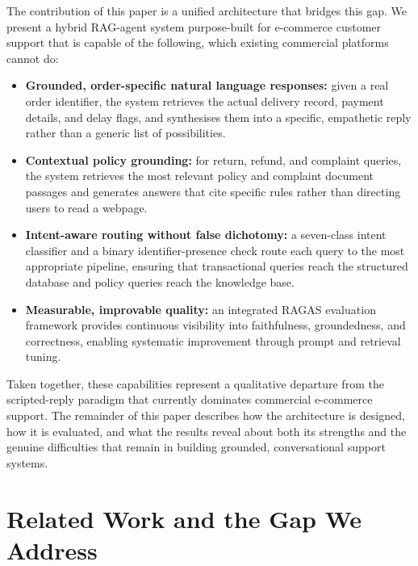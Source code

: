 \documentclass[conference]{IEEEtran}
\begin{document}
The contribution of this paper is a unified architecture that bridges this gap.
We present a hybrid RAG-agent system purpose-built for e-commerce customer support
that is capable of the following, which existing commercial platforms cannot do:

\begin{itemize}
    \item \textbf{Grounded, order-specific natural language responses:} given a
          real order identifier, the system retrieves the actual delivery record,
          payment details, and delay flags, and synthesises them into a specific,
          empathetic reply rather than a generic list of possibilities.

    \item \textbf{Contextual policy grounding:} for return, refund, and complaint
          queries, the system retrieves the most relevant policy and complaint
          document passages and generates answers that cite specific rules rather
          than directing users to read a webpage.

    \item \textbf{Intent-aware routing without false dichotomy:} a seven-class
          intent classifier and a binary identifier-presence check route each query
          to the most appropriate pipeline, ensuring that transactional queries
          reach the structured database and policy queries reach the knowledge base.

    \item \textbf{Measurable, improvable quality:     } an integrated RAGAS evaluation
          framework provides continuous visibility into faithfulness, groundedness,
          and correctness, enabling systematic improvement through prompt and
          retrieval tuning.
\end{itemize}

Taken together, these capabilities represent a qualitative departure from the
scripted-reply paradigm that currently dominates commercial e-commerce support.
The remainder of this paper describes how the architecture is designed, how it
is evaluated, and what the results reveal about both its strengths and the genuine
difficulties that remain in building grounded, conversational support systems.

\section{Related Work and the Gap We Address}
\end{document}
